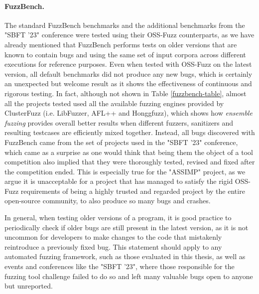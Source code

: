\paragraph{FuzzBench.} The standard FuzzBench benchmarks and the additional benchmarks from the "SBFT '23" conference were tested using their OSS-Fuzz counterparts, as we have already mentioned that FuzzBench performs tests on older versions that are known to contain bugs and using the same set of input corpora across different executions for reference purposes. Even when tested with OSS-Fuzz on the latest version, all default benchmarks did not produce any new bugs, which is certainly an unexpected but welcome result as it shows the effectiveness of continuous and rigorous testing. In fact, although not shown in Table \ref{fuzzbench-table}, almost all the projects tested used all the available fuzzing engines provided by ClusterFuzz (i.e. LibFuzzer, AFL++ and Honggfuzz), which shows how \textit{ensemble fuzzing} provides overall better results when different fuzzers, sanitizers and resulting testcases are efficiently mixed together. Instead, all bugs discovered with FuzzBench came from the set of projects used in the "SBFT '23" conference, which came as a surprise as one would think that being them the object of a tool competition also implied that they were thoroughly tested, revised and fixed after the competition ended. This is especially true for the "ASSIMP" project, as we argue it is unacceptable for a project that has managed to satisfy the rigid OSS-Fuzz requirements of being a highly trusted and regarded project by the entire open-source community, to also produce so many bugs and crashes.

In general, when testing older versions of a program, it is good practice to periodically check if older bugs are still present in the latest version, as it is not uncommon for developers to make changes to the code that mistakenly reintroduce a previously fixed bug. This statement should apply to any automated fuzzing framework, such as those evaluated in this thesis, as well as events and conferences like the "SBFT '23", where those responsible for the fuzzing tool challenge failed to do so and left many valuable bugs open to anyone but unreported. 